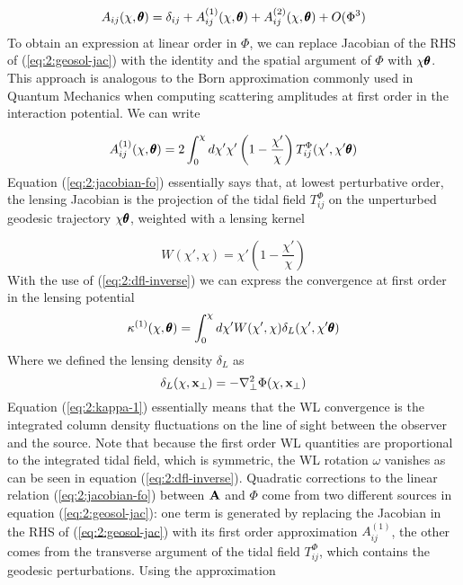 \begin{equation}
\label{eq:2:jacobian-pert}
A_{ij}(\chi,\pmb{\theta}) = \delta_{ij} + A_{ij}^{(1)}(\chi,\pmb{\theta}) + A_{ij}^{(2)}(\chi,\pmb{\theta}) + O(\Phi^3)
\end{equation}
%
To obtain an expression at linear order in $\Phi$, we can replace Jacobian of the RHS of (\ref{eq:2:geosol-jac}) with the identity and the spatial argument of $\Phi$ with $\chi\pmb{\theta}$. This approach is analogous to the Born approximation commonly used in Quantum Mechanics when computing scattering amplitudes at first order in the interaction potential. We can write

\begin{equation}
\label{eq:2:jacobian-fo}
A_{ij}^{(1)}(\chi,\pmb{\theta}) = 2\int_0^\chi d\chi'\chi'\left(1-\frac{\chi'}{\chi}\right)T^{\Phi}_{ij}(\chi',\chi'\pmb{\theta})
\end{equation}
%
Equation (\ref{eq:2:jacobian-fo}) essentially says that, at lowest perturbative order, the lensing Jacobian is the projection of the tidal field $T^{\Phi}_{ij}$ on the unperturbed geodesic trajectory $\chi\pmb{\theta}$, weighted with a lensing kernel

\begin{equation}
W(\chi',\chi) = \chi'\left(1-\frac{\chi'}{\chi}\right) 
\end{equation}
%
With the use of (\ref{eq:2:dfl-inverse}) we can express the convergence at first order in the lensing potential
\begin{equation}
\label{eq:2:kappa-1}
\kappa^{(1)}(\chi,\pmb{\theta}) = \int_0^{\chi}d\chi' W(\chi',\chi)\delta_L(\chi',\chi'\pmb{\theta})
\end{equation}
%
Where we defined the lensing density $\delta_L$ as 
\begin{equation}
\label{eq:2:deltalens}
\delta_L(\chi,\mathbf{x}_\perp) = -\nabla^2_\perp \Phi(\chi,\mathbf{x}_\perp)
\end{equation}
%
Equation (\ref{eq:2:kappa-1}) essentially means that the WL convergence is the integrated column density fluctuations on the line of sight between the observer and the source. Note that because the first order WL quantities are proportional to the integrated tidal field, which is symmetric, the WL rotation $\omega$ vanishes as can be seen in equation (\ref{eq:2:dfl-inverse}). 
Quadratic corrections to the linear relation (\ref{eq:2:jacobian-fo}) between $\mathbf{A}$ and $\Phi$ come from two different sources in equation (\ref{eq:2:geosol-jac}): one term is generated by replacing the Jacobian in the RHS of (\ref{eq:2:geosol-jac}) with its first order approximation $A_{ij}^{(1)}$, the other comes from the transverse argument of the tidal field $T^{\Phi}_{ij}$, which contains the geodesic perturbations. Using the approximation

